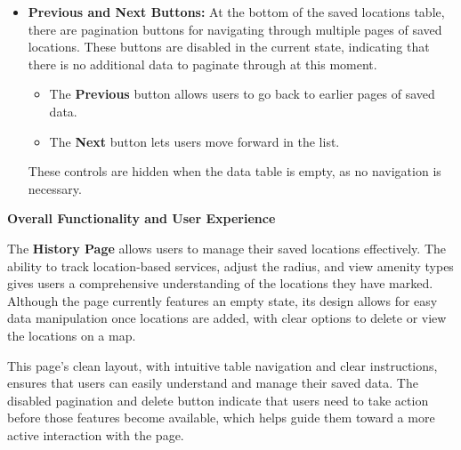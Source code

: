 \begin{itemize}
    \item{} \textbf{Previous and Next Buttons:} At the bottom of the saved locations table, there are pagination buttons for navigating through multiple pages of saved locations. These buttons are disabled in the current state, indicating that there is no additional data to paginate through at this moment.
    \begin{itemize}
        \item{} The \textbf{Previous} button allows users to go back to earlier pages of saved data.
        \item{} The \textbf{Next} button lets users move forward in the list.
    \end{itemize}
    These controls are hidden when the data table is empty, as no navigation is necessary.
\end{itemize}

\textbf{Overall Functionality and User Experience}

The \textbf{History Page} allows users to manage their saved locations effectively. The ability to track location{-}based services, adjust the radius, and view amenity types gives users a comprehensive understanding of the locations they have marked. Although the page currently features an empty state, its design allows for easy data manipulation once locations are added, with clear options to delete or view the locations on a map.

This page’s clean layout, with intuitive table navigation and clear instructions, ensures that users can easily understand and manage their saved data. The disabled pagination and delete button indicate that users need to take action before those features become available, which helps guide them toward a more active interaction with the page.